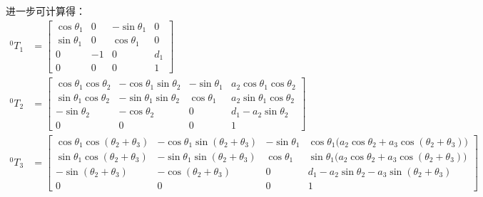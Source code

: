 \documentclass[UTF8, 12pt]{ctexart}
\begin{document}
进一步可计算得：
\[
\begin{aligned}
    {}^0 T_1 &= \begin{bmatrix}
                    \cos\theta_1 & 0 & -\sin\theta_1 & 0 \\
                    \sin\theta_1 & 0 & \cos\theta_1 & 0 \\
                    0 & -1 & 0 & d_1 \\
                    0 & 0 & 0 & 1
                \end{bmatrix} \\
    {}^0 T_2 &= \begin{bmatrix}
                    \cos\theta_1\cos\theta_2 & -\cos\theta_1\sin\theta_2 & -\sin\theta_1 & a_2\cos\theta_1\cos\theta_2 \\
                    \sin\theta_1\cos\theta_2 & -\sin\theta_1\sin\theta_2 & \cos\theta_1 & a_2\sin\theta_1\cos\theta_2 \\
                    -\sin\theta_2 & -\cos\theta_2 & 0 & d_1 - a_2\sin\theta_2 \\
                    0 & 0 & 0 & 1
                \end{bmatrix} \\
    {}^0 T_3 &= \begin{bmatrix}
                    \cos\theta_1\cos(\theta_2+\theta_3) & -\cos\theta_1\sin(\theta_2+\theta_3) & -\sin\theta_1 & \cos\theta_1\big(a_2\cos\theta_2 + a_3\cos(\theta_2+\theta_3)\big) \\
                    \sin\theta_1\cos(\theta_2+\theta_3) & -\sin\theta_1\sin(\theta_2+\theta_3) & \cos\theta_1 & \sin\theta_1\big(a_2\cos\theta_2 + a_3\cos(\theta_2+\theta_3)\big) \\
                    -\sin(\theta_2+\theta_3) & -\cos(\theta_2+\theta_3) & 0 & d_1 - a_2\sin\theta_2 - a_3\sin(\theta_2+\theta_3) \\
                    0 & 0 & 0 & 1
                \end{bmatrix} \\
\end{aligned}
\]
\end{document}
